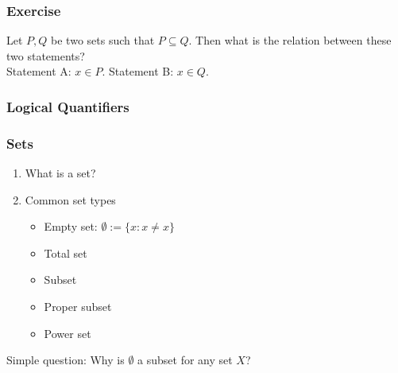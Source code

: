 \documentclass[12pt, t]{beamer}
\begin{document}
\begin{frame}
    \frametitle{Exercise}
    Let $P,Q$ be two sets such that $P \subseteq Q$. Then what is the relation between these
    two statements?
    \\ \center Statement A: $x \in P$. Statement B: $x \in Q$.

\end{frame}

\begin{frame}
    \frametitle{Logical Quantifiers}
    \begin{table}
        \centering
    \end{table} 
\end{frame}

\begin{frame}
    \frametitle{Sets}
\begin{enumerate}
    \item What is a set?
    \item Common set types
    \begin{itemize}
        \item Empty set: $\emptyset := \{x:x\neq x\}$
        \item Total set
        \item Subset
        \item Proper subset
        \item Power set
    \end {itemize}

\end{enumerate}

\par Simple question:
\center Why is $\emptyset$ a subset for any set $X$?
\end{frame}
\end{document}
